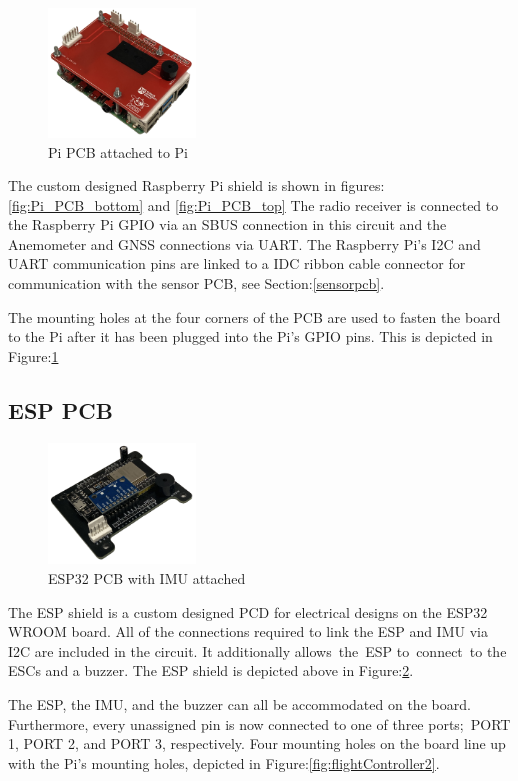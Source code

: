 \documentclass{report}
\begin{document}
\begin{figure}[H]
  \centering
  \includegraphics[width=0.35\textwidth]{Pictures/Pi_PCB_on_Pi.png}
  \caption{Pi PCB attached to Pi}
  \label{fig:Pi_PCB_on_Pi}
\end{figure}
The custom designed Raspberry Pi shield is shown in
figures:\ref{fig:Pi_PCB_bottom} and \ref{fig:Pi_PCB_top} The radio receiver is
connected to the Raspberry Pi GPIO via an SBUS connection in this circuit and
the Anemometer and GNSS connections via UART. The Raspberry Pi's I2C and UART
communication pins are linked to a IDC ribbon cable connector for communication
with the sensor PCB, see Section:\ref{sensorpcb}.

The mounting holes at the four corners of the PCB are used to fasten the board
to the Pi after it has been plugged into the Pi's GPIO pins. This is depicted in
Figure:\ref{fig:Pi_PCB_on_Pi}

\subsection{ESP PCB}
\begin{figure}[H]
  \centering
  \includegraphics[width=0.35\textwidth]{Pictures/Esp_IMU_board.png}
  \caption{ESP32 PCB with IMU attached}
  \label{fig:Esp_IMU_PCB}
\end{figure}
The ESP shield is a custom designed PCD for electrical designs on the ESP32
WROOM board. All of the connections required to link the ESP and IMU via I2C are
included in the circuit. It additionally allows the ESP to connect to the ESCs
and a buzzer. The ESP shield is depicted above in Figure:\ref{fig:Esp_IMU_PCB}.

The ESP, the IMU, and the buzzer can all be accommodated on the board.
Furthermore, every unassigned pin is now connected to one of three ports; PORT
1, PORT 2, and PORT 3, respectively. Four mounting holes on the board line up
with the Pi's mounting holes, depicted in Figure:\ref{fig:flightController2}.
\end{document}
